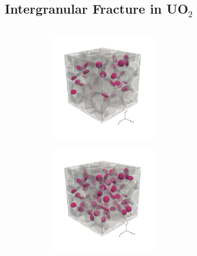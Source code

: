 \subsection{Intergranular Fracture in \texorpdfstring{UO$_2$}{UO2}}

\subsectioncover

\begin{frame}{}
\vspace{-1.5em}
\begin{columns}
    \begin{column}{0.3\textwidth}
        \vspace{-2em}
        \begin{figure}[htb!]
            \centering
            \begin{subfigure}{\textwidth}
                \centering
                \includegraphics[width=0.5\textwidth]{past/figures/b50_ini_new.png}
            \end{subfigure}

            \begin{subfigure}{\textwidth}
                \centering
                \includegraphics[width=0.5\textwidth]{past/figures/b100_ini_new.png}
            \end{subfigure}


\end{figure}
\end{column}
\end{columns}
\end{frame}
